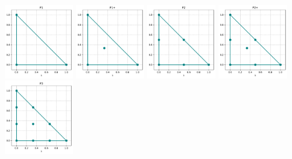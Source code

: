 \includegraphics[width=3cm]{python_codes/fieldstone_120/spaces/P1_nodes}
\includegraphics[width=3cm]{python_codes/fieldstone_120/spaces/P1+_nodes}
\includegraphics[width=3cm]{python_codes/fieldstone_120/spaces/P2_nodes}
\includegraphics[width=3cm]{python_codes/fieldstone_120/spaces/P2+_nodes}
\includegraphics[width=3cm]{python_codes/fieldstone_120/spaces/P3_nodes}


